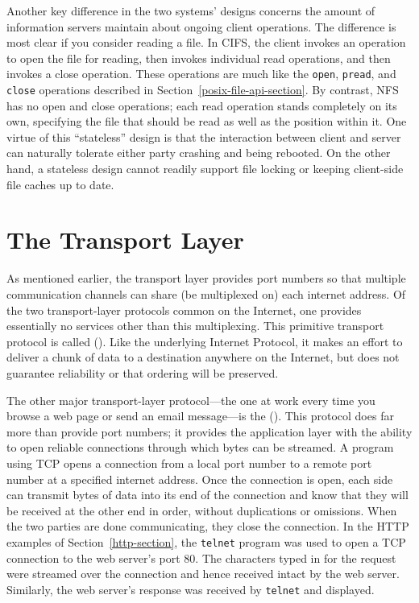 Another key difference in the two systems' designs concerns the amount
of information servers maintain about ongoing client operations.  The
difference is most clear if you consider reading a file.  In CIFS, the
client invokes an operation to open the file for reading, then invokes
individual read operations, and then invokes a close operation.  These
operations are much like the \verb|open|, \verb|pread|, and
\verb|close| operations described in
Section~\ref{posix-file-api-section}.  By contrast, NFS has no open
and close operations; each read operation stands completely on its
own, specifying the file that should be read as well as the position
within it.  One virtue of this ``stateless'' design is that the
interaction between client and server can naturally tolerate either
party crashing and being rebooted.  On the other hand, a stateless
design cannot readily support file locking or keeping client-side
file caches up to date.

\section{The Transport Layer}\label{transport-layer-section}

As mentioned earlier, the transport layer provides port numbers so that
multiple communication channels can share (be multiplexed on) each
internet address.  Of the two transport-layer protocols common on the
Internet, one provides essentially no services other than this
multiplexing.  This primitive transport protocol is called
 ().  Like the underlying
Internet Protocol, it makes an effort to deliver a chunk of data to a
destination anywhere on the Internet, but does not guarantee
reliability or that ordering will be preserved.

The other major transport-layer protocol---the one at work every time
you browse a web page or send an email message---is the
 ().  This protocol does far more
than provide port numbers; it provides the application layer with the
ability to open reliable connections through which bytes can be
streamed.  A program using TCP opens a connection from a local port
number to a remote port number at a specified internet address.  Once
the connection is open, each side can transmit bytes of data into its
end of the connection and know that they will be received at the
other end in order, without duplications or omissions.  When the two
parties are done communicating, they close the connection.  In the
HTTP examples of Section~\ref{http-section}, the \verb|telnet| program
was used to open a TCP connection to the web server's port 80.  The
characters typed in for the request were streamed over the connection
and hence received intact by the web server.  Similarly, the web
server's response was received by \verb|telnet| and displayed.

